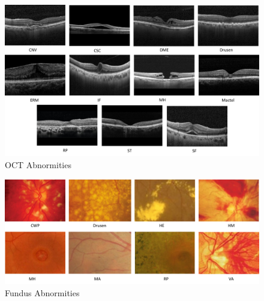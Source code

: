 \documentclass{article}
\begin{document}
	
	\begin{figure}[htbp]
		\centering
		\includegraphics[width=\linewidth]{Figs/OCT_Abnormities.pdf}
		\caption{OCT Abnormities \autocite{Duker_Waheed_Goldman_2022}}
		\vspace{0.3cm}
		\label{fig:OCT_abnormities}
	\end{figure}
	
	\begin{figure}[htbp]
		\centering
		\includegraphics[width=\linewidth]{Figs/fundus_Abnormities.pdf}
		\caption{Fundus Abnormities \autocite{Wolf_Kirchhof_Reim_2006}}
		\vspace{0.3cm}
		\label{fig:fundus_abnormities}
	\end{figure}
	
\end{document}
